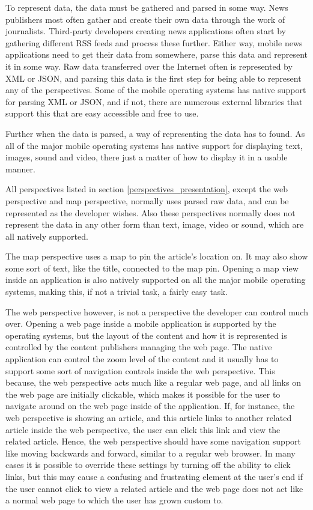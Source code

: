 To represent data, the data must be gathered and parsed in some way. News publishers most often gather and create their own data through the work of journalists. Third-party developers creating news applications often start by gathering different RSS feeds and process these further. Either way, mobile news applications need to get their data from somewhere, parse this data and represent it in some way. Raw data transferred over the Internet often is represented by XML or JSON, and parsing this data is the first step for being able to represent any of the perspectives. Some of the mobile operating systems has native support for parsing XML or JSON, and if not, there are numerous external libraries that support this that are easy accessible and free to use.

Further when the data is parsed, a way of representing the data has to found. As all of the major mobile operating systems has native support for displaying text, images, sound and video, there just a matter of how to display it in a usable manner.

All perspectives listed in section \ref{perspectives_presentation}, except the web perspective and map perspective, normally uses parsed raw data, and can be represented as the developer wishes. Also these perspectives normally does not represent the data in any other form than text, image, video or sound, which are all natively supported.

The map perspective uses a map to pin the article's location on. It may also show some sort of text, like the title, connected to the map pin. Opening a map view inside an application is also natively supported on all the major mobile operating systems, making this, if not a trivial task, a fairly easy task.

The web perspective however, is not a perspective the developer can control much over. Opening a web page inside a mobile application is supported by the operating systems, but the layout of the content and how it is represented is controlled by the content publishers managing the web page. The native application can control the zoom level of the content and it usually has to support some sort of navigation controls inside the web perspective. This because, the web perspective acts much like a regular web page, and all links on the web page are initially clickable, which makes it possible for the user to navigate around on the web page inside of the application. If, for instance, the web perspective is showing an article, and this article links to another related article inside the web perspective, the user can click this link and view the related article. Hence, the web perspective should have some navigation support like moving backwards and forward, similar to a regular web browser. In many cases it is possible to override these settings by turning off the ability to click links, but this may cause a confusing and frustrating element at the user's end if the user cannot click to view a related article and the web page does not act like a normal web page to which the user has grown custom to.